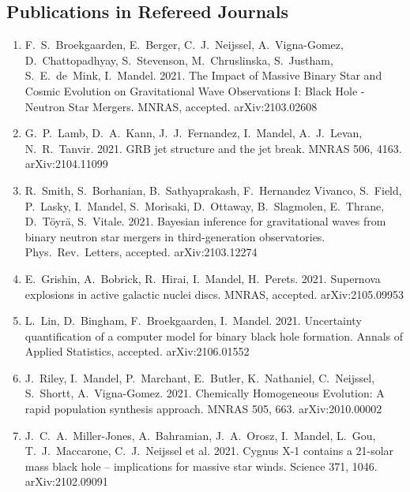 \documentclass[margin,line]{res}
\begin{document}
\begin{resume}
\newpage

\section{\sc Publications in Refereed Journals}

\begin{enumerate}

\item F.~S.~Broekgaarden, E.~Berger, C.~J.~Neijssel, A.~Vigna-Gomez, D.~Chattopadhyay, S.~Stevenson, M.~Chruslinska, S.~Justham, S.~E.~de~Mink, I.~Mandel. 2021. The Impact of Massive Binary Star and Cosmic Evolution on Gravitational Wave Observations I: Black Hole - Neutron Star Mergers.  MNRAS, accepted. arXiv:2103.02608

\item G.~P.~Lamb, D.~A.~Kann, J.~J.~Fernandez, I.~Mandel, A.~J.~Levan, N.~R.~Tanvir. 2021. GRB jet structure and the jet break. MNRAS 506, 4163.  arXiv:2104.11099

\item R.~Smith, S.~Borhanian, B.~Sathyaprakash, F.~Hernandez Vivanco, S.~Field, P.~Lasky, I.~Mandel, S.~Morisaki, D.~Ottaway, B.~Slagmolen, E.~Thrane, D.~T\"{o}yr\"{a}, S.~Vitale.  2021.  Bayesian inference for gravitational waves from binary neutron star mergers in third-generation observatories.  Phys.~Rev.~Letters, accepted. arXiv:2103.12274

\item E.~Grishin, A.~Bobrick, R.~Hirai, I.~Mandel, H.~Perets. 2021.  Supernova explosions in active galactic nuclei discs.  MNRAS, accepted.  arXiv:2105.09953

\item L.~Lin, D.~Bingham, F.~Broekgaarden, I.~Mandel. 2021. Uncertainty quantification of a computer model for binary black hole formation. Annals of Applied Statistics, accepted.  arXiv:2106.01552 

\item J.~Riley, I.~Mandel, P.~Marchant, E.~Butler, K.~Nathaniel, C.~Neijssel, S.~Shortt, A.~Vigna-Gomez.  2021. Chemically Homogeneous Evolution: A rapid population synthesis approach. MNRAS 505, 663.  arXiv:2010.00002

\item J.~C.~A.~Miller-Jones, A.~Bahramian, J.~A.~Orosz, I.~Mandel, L.~Gou, T.~J.~Maccarone, C.~J.~Neijssel et al.  2021.  Cygnus X-1 contains a 21-solar mass black hole -- implications for massive star winds.  Science 371, 1046. arXiv:2102.09091


\end{enumerate}
\end{resume}
\end{document}
